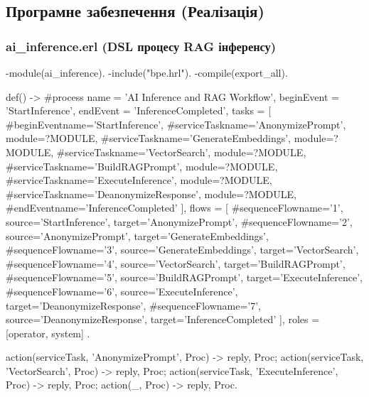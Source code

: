\documentclass{article}
\let\originalfootnotesize\footnotesize
\let\oldverbatim\verbatim
\let\oldendverbatim\endverbatim
\renewenvironment{verbatim}{\originalfootnotesize\oldverbatim}{\oldendverbatim}
\begin{document}
\subsection{Програмне забезпечення (Реалізація)}

\subsubsection{ai\_inference.erl (DSL процесу RAG інференсу)}
\begin{verbatim}
-module(ai_inference).
-include("bpe.hrl").
-compile(export_all).

def() ->
    #process{
        name = 'AI Inference and RAG Workflow',
        beginEvent = 'StartInference',
        endEvent = 'InferenceCompleted',
        tasks = [
            #beginEvent{name='StartInference'},
            #serviceTask{name='AnonymizePrompt', module=?MODULE},
            #serviceTask{name='GenerateEmbeddings', module=?MODULE},
            #serviceTask{name='VectorSearch', module=?MODULE},
            #serviceTask{name='BuildRAGPrompt', module=?MODULE},
            #serviceTask{name='ExecuteInference', module=?MODULE},
            #serviceTask{name='DeanonymizeResponse', module=?MODULE},
            #endEvent{name='InferenceCompleted'}
        ],
        flows = [
            #sequenceFlow{name='1', source='StartInference', target='AnonymizePrompt'},
            #sequenceFlow{name='2', source='AnonymizePrompt', target='GenerateEmbeddings'},
            #sequenceFlow{name='3', source='GenerateEmbeddings', target='VectorSearch'},
            #sequenceFlow{name='4', source='VectorSearch', target='BuildRAGPrompt'},
            #sequenceFlow{name='5', source='BuildRAGPrompt', target='ExecuteInference'},
            #sequenceFlow{name='6', source='ExecuteInference', target='DeanonymizeResponse'},
            #sequenceFlow{name='7', source='DeanonymizeResponse', target='InferenceCompleted'}
        ],
        roles = [operator, system]
    }.

action({serviceTask, 'AnonymizePrompt'}, Proc) ->
    % Виклик локального мікросервісу знеособлення NER
    {reply, Proc};
action({serviceTask, 'VectorSearch'}, Proc) ->
    % Пошук у локальному індексі FAISS
    {reply, Proc};
action({serviceTask, 'ExecuteInference'}, Proc) ->
    % Інференс на GPU RTX 4070 Ti через llama.cpp
    {reply, Proc};
action(_, Proc) -> {reply, Proc}.
\end{verbatim}
\end{document}
